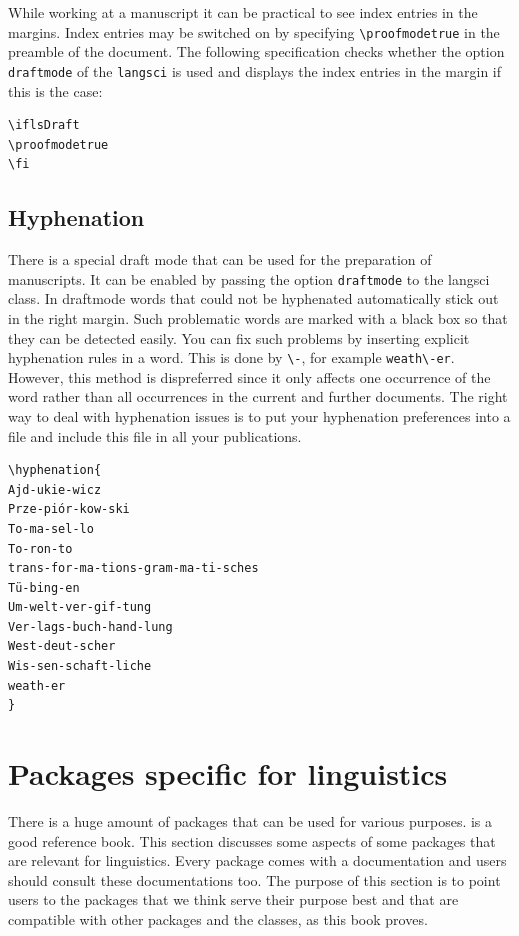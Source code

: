 While working at a manuscript it can be practical to see index entries in the margins. Index entries may be
switched on by specifying \verb+\proofmodetrue+ in the preamble of the
document. The following specification checks whether the option
\texttt{draftmode} of the \texttt{langsci} is used and displays the index entries in the margin if
this is the case:
\begin{verbatim}
\iflsDraft
\proofmodetrue
\fi
\end{verbatim}



\subsection{Hyphenation}

There is a special draft mode that can be used for the preparation of manuscripts. It can be enabled
by passing the option \texttt{draftmode} to the langsci class. In draftmode words that could not be
hyphenated automatically stick out in the right margin. Such problematic words are marked with a
black box so that they can be detected easily. You can fix such problems by inserting explicit
hyphenation rules in a word. This is done by \verb+\-+, for example \verb+weath\-er+. However, this
method is dispreferred since it only affects one occurrence of the word rather than all occurrences in
the current and further documents. The right way to deal with hyphenation issues is to put your
hyphenation preferences into a file and include this file in all your publications. 

\begin{verbatim}
\hyphenation{
Ajd-ukie-wicz
Prze-piór-kow-ski
To-ma-sel-lo
To-ron-to
trans-for-ma-tions-gram-ma-ti-sches
Tü-bing-en
Um-welt-ver-gif-tung
Ver-lags-buch-hand-lung
West-deut-scher
Wis-sen-schaft-liche
weath-er
}
\end{verbatim}

%



\section{Packages specific for linguistics}

There is a huge amount of packages that can be used for various purposes.  is a good
reference book. This section discusses some aspects of some packages that are relevant for
linguistics. Every \latex package comes with a documentation and users should consult these
documentations too. The purpose of this section is to point users to the packages that we think
serve their purpose best and that are compatible with other packages and the \lsp classes, as this
book proves.

